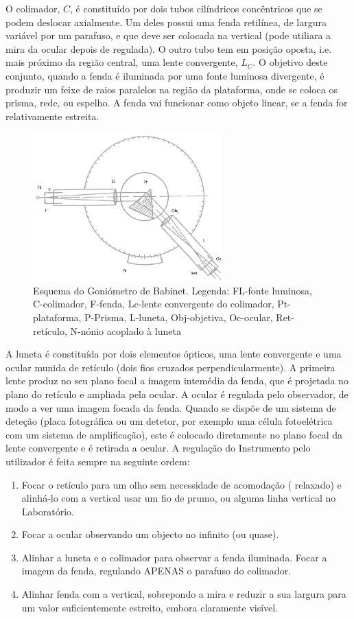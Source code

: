 \documentclass[a4paper,12pt]{article}      %
\begin{document}
O colimador, $C$, é constituído por dois tubos cilíndricos concêntricos que se podem deslocar axialmente. Um deles possui uma fenda retilínea, de largura variável por um parafuso, e que deve ser colocada na vertical (pode utiliara a mira da ocular depois de regulada). O outro tubo tem em posição oposta, i.e. mais próximo da região central, uma lente convergente, $L_C$. O objetivo deste conjunto, quando a fenda é iluminada por uma fonte luminosa divergente, é produzir um feixe de raios paralelos na região da plataforma, onde se coloca os prisma, rede, ou espelho. 
A fenda vai funcionar como objeto linear, se a fenda for relativamente estreita.

\begin{figure}[!htb]  
	\centering 
	\includegraphics[width=0.65\textwidth]{babinet}
	\caption{Esquema do Goniómetro de Babinet. Legenda: FL-fonte luminosa, C-colimador, F-fenda, Lc-lente convergente do colimador, Pt-plataforma, P-Prisma, L-luneta, Obj-objetiva, Oc-ocular, Ret-retículo, N-nónio acoplado à luneta\label{fig:babinet}} 
\end{figure}

A luneta é constituída por dois elementos ópticos, uma lente convergente e uma ocular munida de retículo (dois fios cruzados perpendicularmente). A primeira lente produz no seu plano focal a imagem intemédia da fenda, que é projetada no plano do retículo e ampliada pela ocular. A ocular é regulada pelo observador, de modo a ver uma imagem focada da fenda. Quando se dispõe de um sistema de deteção (placa fotográfica ou um detetor, por exemplo uma célula fotoelétrica com um sistema de amplificação), este é colocado diretamente no plano focal da lente convergente e é retirada a ocular.
A regulação do Instrumento pelo utilizador é feita sempre na seguinte ordem:
\begin{enumerate}
\item Focar  o retículo para um olho sem necessidade de acomodação ( relaxado) e alinhá-lo com a vertical usar um fio de prumo, ou alguma linha vertical no Laboratório.
\item Focar a ocular observando um objecto no infinito (ou quase).
\item Alinhar a luneta e o colimador para observar a fenda iluminada. Focar a imagem da fenda, regulando APENAS o parafuso do colimador.
\item Alinhar fenda com a vertical, sobrepondo a mira e reduzir a sua largura para um valor suficientemente estreito, embora claramente visível.
\end{enumerate}
\end{document}

